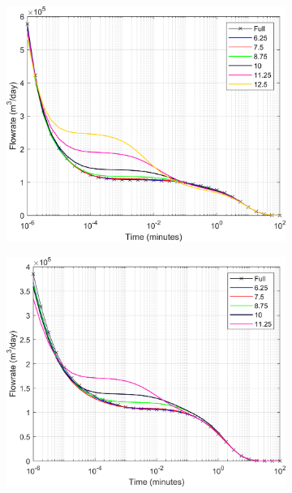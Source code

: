 \documentclass[Supplementary.tex]{subfiles}
\begin{document}
\begin{figure}[ht]
\begin{subfigure}{0.3\textwidth}
        \label{fig:3D_DD_10}
     \end{subfigure}
     \begin{subfigure}{0.3\textwidth}
        \includegraphics[width=\textwidth]{3D_DD/Plot_Drawdown_Case_11_nohead.png}
        \label{fig:3D_DD_11}
     \end{subfigure}
     \begin{subfigure}{0.3\textwidth}
        \includegraphics[width=\textwidth]{3D_DD/Plot_Drawdown_Case_12_nohead.png}

\end{subfigure}
\end{figure}
\end{document}
